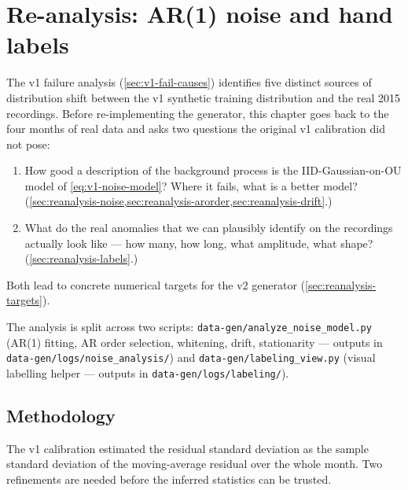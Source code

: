 \chapter{Re-analysis: AR(1) noise and hand labels}
\label{chap:reanalysis}

The v1 failure analysis (\cref{sec:v1-fail-causes}) identifies five
distinct sources of distribution shift between the v1 synthetic
training distribution and the real 2015 recordings. Before
re-implementing the generator, this chapter goes back to the four
months of real data and asks two questions the original v1 calibration
did not pose:
\begin{enumerate}[leftmargin=*, itemsep=0.2em]
    \item How good a description of the background process is the
    IID-Gaussian-on-OU model of \cref{eq:v1-noise-model}? Where it
    fails, what is a better model?
    (\cref{sec:reanalysis-noise,sec:reanalysis-arorder,sec:reanalysis-drift}.)
    \item What do the real anomalies that we can plausibly identify
    on the recordings actually look like --- how many, how long, what
    amplitude, what shape? (\cref{sec:reanalysis-labels}.)
\end{enumerate}
Both lead to concrete numerical targets for the v2 generator
(\cref{sec:reanalysis-targets}).

The analysis is split across two scripts:
\texttt{data-gen/analyze\_noise\_model.py} (AR(1) fitting, AR order
selection, whitening, drift, stationarity --- outputs in
\texttt{data-gen/logs/noise\_analysis/}) and
\texttt{data-gen/labeling\_view.py} (visual labelling helper ---
outputs in \texttt{data-gen/logs/labeling/}).

\section{Methodology}
\label{sec:reanalysis-method}

The v1 calibration estimated the residual standard deviation as the
sample standard deviation of the moving-average residual over the
whole month. Two refinements are needed before the inferred statistics
can be trusted.

